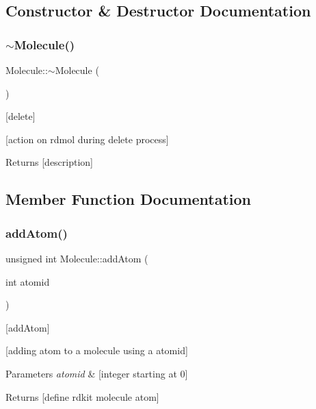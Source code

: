 \subsection{Constructor \& Destructor Documentation}
\mbox{\label{class_molecule_a1ff980b574a62526abff3d631c83bf94}} 
\subsubsection{\texorpdfstring{$\sim$\+Molecule()}{~Molecule()}}
{\footnotesize\ttfamily Molecule\+::$\sim$\+Molecule (\begin{DoxyParamCaption}{ }\end{DoxyParamCaption})}



\mbox{[}delete\mbox{]} 

\mbox{[}action on rdmol during delete process\mbox{]} \begin{DoxyReturn}{Returns}
\mbox{[}description\mbox{]} 
\end{DoxyReturn}


\subsection{Member Function Documentation}
\mbox{\label{class_molecule_a2ef7b76adda28cd4932d07c35d330f71}} 
\subsubsection{\texorpdfstring{add\+Atom()}{addAtom()}}
{\footnotesize\ttfamily unsigned int Molecule\+::add\+Atom (\begin{DoxyParamCaption}\item[{int}]{atomid }\end{DoxyParamCaption})}



\mbox{[}add\+Atom\mbox{]} 

\mbox{[}adding atom to a molecule using a atomid\mbox{]}


\begin{DoxyParams}{Parameters}
{\em atomid} & \mbox{[}integer starting at 0\mbox{]} \\
\hline
\end{DoxyParams}
\begin{DoxyReturn}{Returns}
\mbox{[}define rdkit molecule atom\mbox{]} 
\end{DoxyReturn}
\mbox{\label{class_molecule_ad1c8dfe8ea7c2026bcdbdd2c90fa17b8}} 
